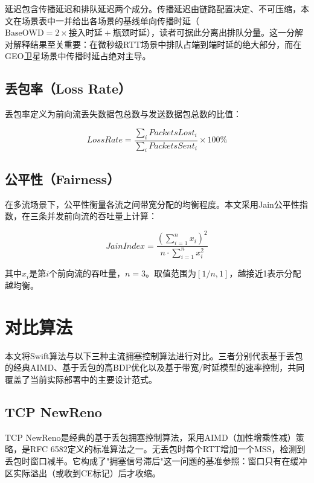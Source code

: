 延迟包含传播延迟和排队延迟两个成分。传播延迟由链路配置决定、不可压缩，本文在场景表中一并给出各场景的基线单向传播时延（$\text{BaseOWD} = 2 \times \text{接入时延} + \text{瓶颈时延}$），读者可据此分离出排队分量。这一分解对解释结果至关重要：在微秒级RTT场景中排队占端到端时延的绝大部分，而在GEO卫星场景中传播时延占绝对主导。

\subsection{丢包率（Loss Rate）}

丢包率定义为前向流丢失数据包总数与发送数据包总数的比值：

\begin{equation}
LossRate = \frac{\sum_i PacketsLost_i}{\sum_i PacketsSent_i} \times 100\%
\end{equation}

\subsection{公平性（Fairness）}

在多流场景下，公平性衡量各流之间带宽分配的均衡程度。本文采用Jain公平性指数，在三条并发前向流的吞吐量上计算：

\begin{equation}
JainIndex = \frac{(\sum_{i=1}^{n} x_i)^2}{n \cdot \sum_{i=1}^{n} x_i^2}
\end{equation}

其中$x_i$是第$i$个前向流的吞吐量，$n=3$。取值范围为$[1/n, 1]$，越接近1表示分配越均衡。

\section{对比算法}

本文将Swift算法与以下三种主流拥塞控制算法进行对比。三者分别代表基于丢包的经典AIMD、基于丢包的高BDP优化以及基于带宽/时延模型的速率控制，共同覆盖了当前实际部署中的主要设计范式。

\subsection{TCP NewReno}

TCP NewReno是经典的基于丢包拥塞控制算法，采用AIMD（加性增乘性减）策略，是RFC 6582定义的标准算法之一。无丢包时每个RTT增加一个MSS，检测到丢包时窗口减半。它构成了"拥塞信号滞后"这一问题的基准参照：窗口只有在缓冲区实际溢出（或收到CE标记）后才收缩。

